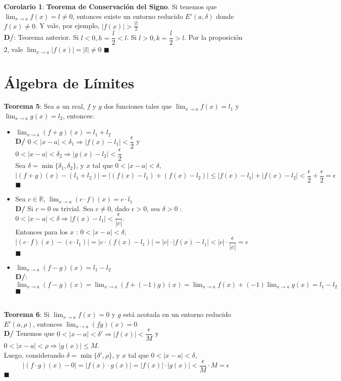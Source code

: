 \documentclass[11pt,a4paper]{article}
\newcommand*{\QEDA}{\null\nobreak\hfill\ensuremath{\blacksquare}}
\begin{document}
\noindent \textbf{Corolario 1}: \textbf{Teorema de Conservaci\'on del Signo}. Si tenemos que $\displaystyle{\lim_{x\to a}f(x) = l \not = 0}$, entonces existe un entorno reducido $E'(a,\delta)$ donde $f(x)\not = 0$. Y vale, por ejemplo, $|f(x)| > \frac{|l|}{2}$\\
\noindent \textbf{D/}: Teorema anterior. Si $l<0, h=\dfrac{l}{2}<l$. Si $l>0, k=\dfrac{l}{2}>l$. Por la proposici\'on 2, vale $\displaystyle{\lim_{x\to a}|f(x)| = |l| \not = 0}$ \QEDA\\

\section{\'Algebra de L\'imites}
\noindent \textbf{Teorema 5}: Sea $a$ un real, $f$ y $g$ dos funciones tales que $\displaystyle{\lim_{x\to a}f(x) = l_1}$ y $\displaystyle{\lim_{x\to a}g(x) = l_2}$, entonces:
\begin{itemize}
\item $\displaystyle{\lim_{x\to a}(f+g)(x) = l_1 + l_2}$\\
\textbf{D/} $0<|x-a|<\delta_1 \Rightarrow |f(x)-l_1| < \dfrac{\epsilon}{2}$ y $0<|x-a|<\delta_2 \Rightarrow |g(x)-l_2| < \dfrac{\epsilon}{2}$\\
Sea $\delta=\min\{\delta_1, \delta_2\}$, y $x$ tal que $0<|x-a|<\delta$,\\
$|(f+g)(x)-(l_1+l_2)| = |(f(x)-l_1)+(f(x)-l_2)| \leq |f(x)-l_1| + |f(x)-l_2| < \dfrac{\epsilon}{2} + \dfrac{\epsilon}{2} = \epsilon$
\QEDA
\item Sea $c\in \mathbb{R}$, $\displaystyle{\lim_{x\to a}(c\cdot f)(x) = c\cdot l_1}$\\
\textbf{D/} Si $c=0$ es trivial. Sea $c\not = 0$, dado $\epsilon > 0$, sea $\delta > 0$ : $0<|x-a|<\delta \Rightarrow |f(x)-l_1| < \dfrac{\epsilon}{|c|}$.\\
Entonces para los $x$ : $0<|x-a|<\delta$, $|(c\cdot f)(x) - (c\cdot l_1)| = |c \cdot (f(x)-l_1)| = |c|\cdot|f(x)-l_1| < |c|\cdot\dfrac{\epsilon}{|c|}=\epsilon$
\QEDA
\item $\displaystyle{\lim_{x\to a}(f-g)(x) = l_1 - l_2}$\\
\textbf{D/}: $\displaystyle{\lim_{x\to a}(f-g)(x) = \lim_{x\to a}(f+ (-1)g)(x) = \lim_{x\to a}f(x) + (-1)\lim_{x\to a}g(x) = l_1 - l_2}$
\QEDA\\ \\
\end{itemize}

\noindent \textbf{Teorema 6}: Si $\displaystyle{\lim_{x\to a}f(x) = 0}$ y $g$ est\'a acotada en un entorno reducido $E'(a,\rho)$, entonces $\displaystyle{\lim_{x\to a}(fg)(x) = 0}$\\
\noindent \textbf{D/} Tenemos que $0<|x-a|<\delta' \Rightarrow |f(x)|<\dfrac{\epsilon}{M}$ y $0<|x-a|<\rho \Rightarrow |g(x)| \leq M$.\\
Luego, considerando $\delta = \min\{\delta', \rho\}$, y $x$ tal que $0<|x-a|<\delta$, $$|(f\cdot g)(x)-0| = |f(x)\cdot g(x)| = |f(x)|\cdot|g(x)| < \dfrac{\epsilon}{M} \cdot M = \epsilon$$
\QEDA\\
\end{document}
